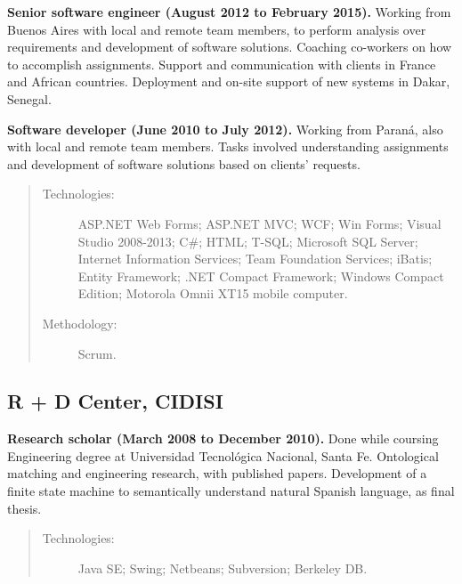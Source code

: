 \textbf{Senior software engineer (August 2012 to February 2015).} Working from Buenos Aires with local and remote team members, to perform analysis over requirements and development of software solutions. Coaching co-workers on how to accomplish assignments. Support and communication with clients in France and African countries. Deployment and on-site support of new systems in Dakar, Senegal.
\par
\bigskip
\textbf{Software developer (June 2010 to July 2012).} Working from Paraná, also with local and remote team members. Tasks involved understanding assignments and development of software solutions based on clients' requests.

\begin{quote}
\begin{description}
    \item[Technologies:] ASP.NET Web Forms; ASP.NET MVC; WCF; Win Forms; Visual Studio 2008-2013; C\#; HTML; T-SQL; Microsoft SQL Server; Internet Information Services; Team Foundation Services; iBatis; Entity Framework; .NET Compact Framework; Windows Compact Edition; Motorola Omnii XT15 mobile computer.
    \item[Methodology:] Scrum.
\end{description}
\end{quote}

\subsection*{R + D Center, CIDISI}

\textbf{Research scholar (March 2008 to December 2010).} Done while coursing Engineering degree at Universidad Tecnológica Nacional, Santa Fe. Ontological matching and engineering research, with published papers. Development of a finite state machine to semantically understand natural Spanish language, as final thesis.

\begin{quote}
\begin{description}
    \item[Technologies:] Java SE; Swing; Netbeans; Subversion; Berkeley DB.    
\end{description}
\end{quote}